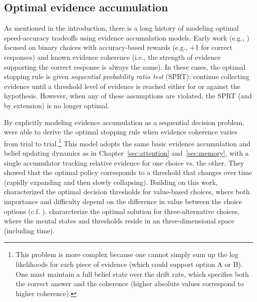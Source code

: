 \subsection{Optimal evidence accumulation}

As mentioned in the introduction, there is a long history of modeling optimal speed-accuracy tradeoffs using evidence accumulation models. Early work (e.g., \citealp{bogacz2006physics,vul2009one}) focused on binary choices with accuracy-based rewards (e.g., +1 for correct responses) and known evidence coherence (i.e., the strength of evidence supporting the correct response is always the same). In these cases, the optimal stopping rule is given \emph{sequential probability ratio test} (SPRT): continue collecting evidence until a threshold level of evidence is reached either for or against the hypothesis. However, when any of these assumptions are violated, the SPRT (and by extension) is no longer optimal.

By explicitly modeling evidence accumulation as a sequential decision problem, \citet{drugowitsch2012cost} were able to derive the optimal stopping rule when evidence coherence varies from trial to trial.\footnote{%
  This problem is more complex because one cannot simply sum up the log likelihoods for each piece of evidence (which could support option A or B). One must maintain a full belief state over the drift rate, which specifies both the correct answer and the coherence (higher absolute values correspond to higher coherence). 
} This model adopts the same basic evidence accumulation and belief updating dynamics as in Chapter~\ref{sec:attention} and~\ref{sec:memory}, with a single accumulator tracking relative evidence for one choice vs. the other. They showed that the optimal policy corresponds to a threshold that changes over time (rapidly expanding and then slowly collapsing). Building on this work, \citet{tajima2016optimal} characterized the optimal decision thresholds for value-based choices, where both importance and difficulty depend on the difference in value between the choice options (c.f. \citealp{fudenberg2018speed}). \citet{tajima2019optimal} chararcterize the optimal solution for three-alternative choices, where the mental states and thresholds reside in an three-dimensional space (including time).

